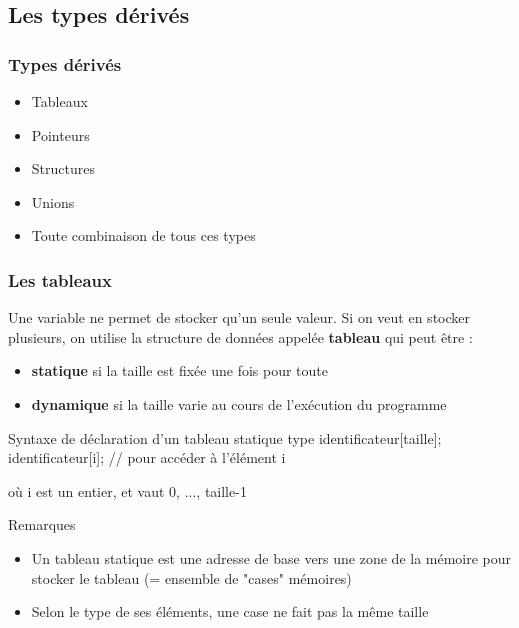 \documentclass{beamer}
\begin{document}
\subsection{Les types dérivés}

\begin{frame}
\frametitle {Types dérivés}
\begin{itemize}
\item{Tableaux}
\item{Pointeurs}
\item{Structures}
\item{Unions}
\item{Toute combinaison de tous ces types}
\end{itemize}
\end{frame}

\begin{frame}[fragile=singleslide,shrink=20]
\frametitle{Les tableaux}

Une variable ne permet de stocker qu'un seule valeur. Si on veut en stocker plusieurs, on utilise la structure de données appelée \textbf{tableau} qui peut être : 
\begin{itemize}
\item{\textbf{statique} si la taille est fixée une fois pour toute}
\item{\textbf{dynamique} si la taille varie au cours de l'exécution du programme}
\end{itemize}


\begin{block}{Syntaxe de déclaration d'un tableau statique}
type identificateur[taille];\\
identificateur[i];  // pour accéder à l'élément i
\end{block}
où i est un entier, et vaut 0, ..., taille-1  


\begin{block}{Remarques}
\begin{itemize} 
\item{Un tableau statique est une adresse de base vers une zone de la mémoire pour stocker le tableau (= ensemble de "cases" mémoires) }
\item{Selon le type de ses éléments, une case ne fait pas la même taille}
\end{itemize}
\end{block}

\end{frame}
\end{document}
